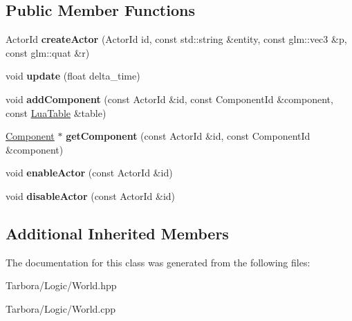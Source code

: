 \subsection*{Public Member Functions}
\begin{DoxyCompactItemize}
\item 
\mbox{\label{classTarbora_1_1World_a9e7b76d9d1230f131996664fc2348b99}} 
Actor\+Id {\bfseries create\+Actor} (Actor\+Id id, const std\+::string \&entity, const glm\+::vec3 \&p, const glm\+::quat \&r)
\item 
\mbox{\label{classTarbora_1_1World_a64569055001d1cd3d68c74d540c18a60}} 
void {\bfseries update} (float delta\+\_\+time)
\item 
\mbox{\label{classTarbora_1_1World_af72495b62c28dfb15998b9168da574d1}} 
void {\bfseries add\+Component} (const Actor\+Id \&id, const Component\+Id \&component, const \hyperlink{classTarbora_1_1LuaTable}{Lua\+Table} \&table)
\item 
\mbox{\label{classTarbora_1_1World_a990fd3df957540927273d790cb6b0ffe}} 
\hyperlink{classTarbora_1_1Component}{Component} $\ast$ {\bfseries get\+Component} (const Actor\+Id \&id, const Component\+Id \&component)
\item 
\mbox{\label{classTarbora_1_1World_a389d4d1710a730cf774f3eb1e7f7b8a0}} 
void {\bfseries enable\+Actor} (const Actor\+Id \&id)
\item 
\mbox{\label{classTarbora_1_1World_ad353ce0e49bc3ed9b7fe62580e95ca59}} 
void {\bfseries disable\+Actor} (const Actor\+Id \&id)
\end{DoxyCompactItemize}
\subsection*{Additional Inherited Members}


The documentation for this class was generated from the following files\+:\begin{DoxyCompactItemize}
\item 
Tarbora/\+Logic/World.\+hpp\item 
Tarbora/\+Logic/World.\+cpp\end{DoxyCompactItemize}
